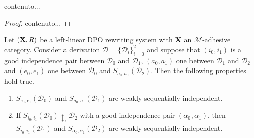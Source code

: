 \documentclass[a4paper,UKenglish,cleveref,pdftex, thm-restate,numberwithinsect]{lipics}
\def\R{\mathsf{R}}
\def\X{\textbf {\textup{X}}}
\newcommand{\dder}[1]{\mathscr{#1}}
\newcommand{\der}[1]{\underline{\dder{#1}}}
\begin{document}
\begin{lemma}\label{lem:terzo}
	contenuto...
\end{lemma}
\begin{proof}
	contenuto...
\end{proof}


\begin{lemma}\label{lem:iig1}Let $(\X,\R)$ be a left-linear DPO rewriting system with $\X$ an $\mathcal{M}$-adhesive category. Consider a derivation $\der{D}=\{\dder{D}_i\}_{i=0}^2$ and suppose that $(i_0,i_1)$ is a good independence pair between $\dder{D}_0$ and $\dder{D}_1$, $(a_0,a_1)$ one between $\dder{D}_1$ and $\dder{D}_2$ and $(e_0, e_1)$ one between $\dder{D}_0$ and $S_{a_0,a_1}(\dder{D}_2)$. Then the following properties hold true.
	\begin{enumerate}
		\item $S_{e_0,e_1}(\dder{D}_0)$ and $S_{a_0,a_1}(\dder{D}_1)$ are weakly sequentially independent.
		\item If $S_{i_0, i_1}(\dder{D}_0)\updownarrow_! \dder{D}_2$ with a good independence pair $(\alpha_0, \alpha_1)$, then  $S_{i_0,i_1}(\dder{D}_1)$ and $S_{\alpha_0, \alpha_1}(\dder{D}_2)$ are weakly sequentially independent.
	\end{enumerate}
	
      \end{lemma}
\end{document}
